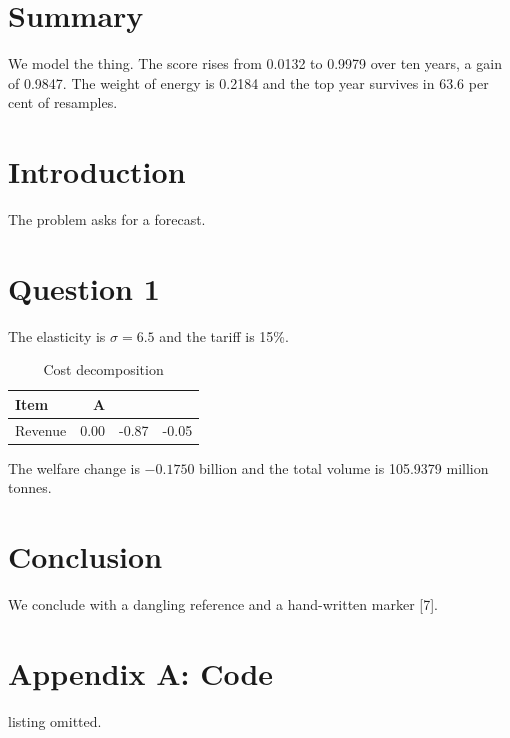 \documentclass[11pt]{article}
\begin{document}
\section{Summary}
We model the thing. The score rises from 0.0132 to 0.9979 over ten years, a gain of 0.9847.
The weight of energy is 0.2184 and the top year survives in 63.6 per cent of resamples.
\section{Introduction}
The problem asks for a forecast.
\section{Question 1}
The elasticity is $\sigma=6.5$ and the tariff is 15\%.
\begin{table}[htbp]\centering\caption{Cost decomposition}\label{tab:cost}
\begin{tabular}{@{}lr@{}}\toprule Item & A \\ \midrule
Revenue & 0.00 & -0.87 & -0.05 \\ \bottomrule\end{tabular}\end{table}
The welfare change is $-0.1750$ billion and the total volume is 105.9379 million tonnes.
\section{Conclusion}
We conclude with a dangling reference \cite{nope} and a hand-written marker [7].
\section*{Appendix A: Code}
\noindent listing omitted.
\end{document}
